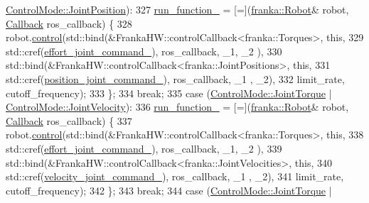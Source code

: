\begin{DoxyCode}
      \hyperlink{namespacefranka__hw_afa416558ce4baace5ac6c71bd5d2c98caa10d0bc4b1db478900a14e066c4c3333}{ControlMode::JointPosition}):
327       \hyperlink{classfranka__hw_1_1FrankaHW_ab53d17aecdb62936defdcde99e9b88b8}{run\_function\_} = [=](\hyperlink{classfranka_1_1Robot}{franka::Robot}& robot, 
      \hyperlink{classfranka__hw_1_1FrankaHW_ac576bd5140a03864888c68519daa5aa4}{Callback} ros\_callback) \{
328         robot.\hyperlink{classfranka_1_1Robot_a5b5ba0a4f2bfd20be963b05622e629e1}{control}(std::bind(&FrankaHW::controlCallback<franka::Torques>, \textcolor{keyword}{this},
329                                 std::cref(\hyperlink{classfranka__hw_1_1FrankaHW_a718469d0646cacde1bd8ad1b798a528c}{effort\_joint\_command\_}), ros\_callback, \_1, \_2
      ),
330                       std::bind(&FrankaHW::controlCallback<franka::JointPositions>, \textcolor{keyword}{this},
331                                 std::cref(\hyperlink{classfranka__hw_1_1FrankaHW_a21bc8c749210aa50ac5a847065d01042}{position\_joint\_command\_}), ros\_callback, \_1
      , \_2),
332                       limit\_rate, cutoff\_frequency);
333       \};
334       \textcolor{keywordflow}{break};
335     \textcolor{keywordflow}{case} (\hyperlink{namespacefranka__hw_afa416558ce4baace5ac6c71bd5d2c98ca6c640e0814bb12aecaa28d237d393467}{ControlMode::JointTorque} | 
      \hyperlink{namespacefranka__hw_afa416558ce4baace5ac6c71bd5d2c98cab71066787fa2ea98f88027078359cd93}{ControlMode::JointVelocity}):
336       \hyperlink{classfranka__hw_1_1FrankaHW_ab53d17aecdb62936defdcde99e9b88b8}{run\_function\_} = [=](\hyperlink{classfranka_1_1Robot}{franka::Robot}& robot, 
      \hyperlink{classfranka__hw_1_1FrankaHW_ac576bd5140a03864888c68519daa5aa4}{Callback} ros\_callback) \{
337         robot.\hyperlink{classfranka_1_1Robot_a5b5ba0a4f2bfd20be963b05622e629e1}{control}(std::bind(&FrankaHW::controlCallback<franka::Torques>, \textcolor{keyword}{this},
338                                 std::cref(\hyperlink{classfranka__hw_1_1FrankaHW_a718469d0646cacde1bd8ad1b798a528c}{effort\_joint\_command\_}), ros\_callback, \_1, \_2
      ),
339                       std::bind(&FrankaHW::controlCallback<franka::JointVelocities>, \textcolor{keyword}{this},
340                                 std::cref(\hyperlink{classfranka__hw_1_1FrankaHW_ae25ff898759d1f0c9a34c873cadd8e01}{velocity\_joint\_command\_}), ros\_callback, \_1
      , \_2),
341                       limit\_rate, cutoff\_frequency);
342       \};
343       \textcolor{keywordflow}{break};
344     \textcolor{keywordflow}{case} (\hyperlink{namespacefranka__hw_afa416558ce4baace5ac6c71bd5d2c98ca6c640e0814bb12aecaa28d237d393467}{ControlMode::JointTorque} | 

\end{DoxyCode}
